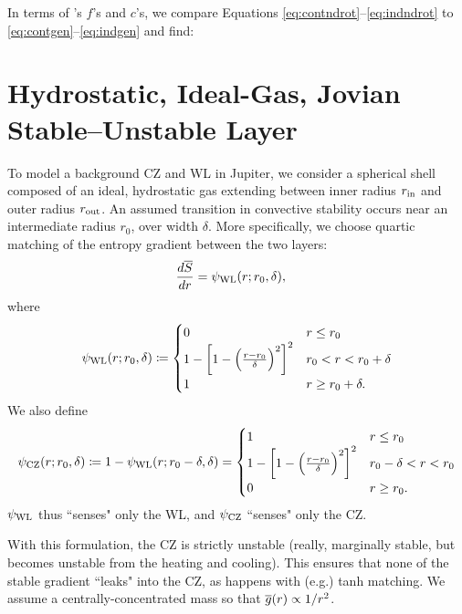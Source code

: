 \documentclass[12pt]{article}
\numberwithin{equation}{section}
\newcommand{\cz}{_{\rm{CZ}}}
\newcommand{\wl}{_{\rm{WL}}}
\begin{document}
In terms of {\rayleigh}'s $f$'s and $c$'s, we compare Equations \eqref{eq:contndrot}--\eqref{eq:indndrot} to \eqref{eq:contgen}--\eqref{eq:indgen} and find:

\section{Hydrostatic, Ideal-Gas, Jovian Stable--Unstable Layer}
To model a background CZ and WL in Jupiter, we consider a spherical shell composed of an ideal, hydrostatic gas extending between inner radius $r_{\rm{in}}$ and outer radius $r_{\rm{out}}$. An assumed transition in convective stability occurs near an intermediate radius $r_0$, over width $\delta$. More specifically, we choose quartic matching of the entropy gradient between the two layers:
\begin{align}
	\frac{d\sref}{dr} &=\psi\wl(r; r_0,\delta),
\end{align}
where
\begin{equation}
  \psi\wl(r;r_0, \delta)\define \begin{cases}
		0 & r\leq r_0 \\
		1 - \left[1 - \Big{(}\frac{r-r_0}{\delta}\Big{)}^2\right]^2 & r_0  < r < r_0+ \delta\\
		1 & r\geq r_0+\delta.
	\end{cases}
	\label{eq:dsdr}
\end{equation}
We also define
\begin{equation}
	\psi\cz(r;r_0, \delta)\define 1 - \psi\wl(r;r_0-\delta,\delta) =  \begin{cases}
		1 & r\leq r_0 \\
		1 - \left[1 - \Big{(}\frac{r-r_0}{\delta}\Big{)}^2\right]^2 & r_0 -\delta  < r < r_0\\
		0 & r\geq r_0.
	\end{cases}
	\label{eq:dsdr}
\end{equation}
$\psi\wl$ thus ``senses" only the WL, and $\psi\cz$ ``senses" only the CZ. 

With this formulation, the CZ is strictly unstable (really, marginally stable, but becomes unstable from the heating and cooling). This ensures that none of the stable gradient ``leaks" into the CZ, as happens with (e.g.) tanh matching. We assume a centrally-concentrated mass so that $\overline{g}(r)\propto 1/r^2$. 
\end{document}
